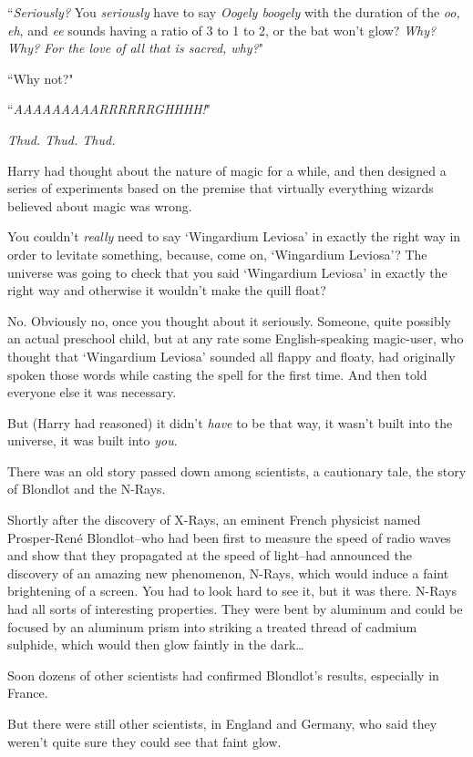 ``\emph{Seriously?} You \emph{seriously} have to say \emph{Oogely boogely} with the duration of the \emph{oo, eh}, and \emph{ee} sounds having a ratio of 3 to 1 to 2, or the bat won't glow? \emph{Why? Why? For the love of all that is sacred, why?}"

``Why not?"

``\emph{AAAAAAAAARRRRRRGHHHH!}"

\emph{Thud. Thud. Thud.}

Harry had thought about the nature of magic for a while, and then designed a series of experiments based on the premise that virtually everything wizards believed about magic was wrong.

You couldn't \emph{really} need to say `Wingardium Leviosa' in exactly the right way in order to levitate something, because, come on, `Wingardium Leviosa'? The universe was going to check that you said `Wingardium Leviosa' in exactly the right way and otherwise it wouldn't make the quill float?

No. Obviously no, once you thought about it seriously. Someone, quite possibly an actual preschool child, but at any rate some English-speaking magic-user, who thought that `Wingardium Leviosa' sounded all flappy and floaty, had originally spoken those words while casting the spell for the first time. And then told everyone else it was necessary.

But (Harry had reasoned) it didn't \emph{have} to be that way, it wasn't built into the universe, it was built into \emph{you}.

There was an old story passed down among scientists, a cautionary tale, the story of Blondlot and the N-Rays.

Shortly after the discovery of X-Rays, an eminent French physicist named Prosper-René Blondlot\---who had been first to measure the speed of radio waves and show that they propagated at the speed of light\---had announced the discovery of an amazing new phenomenon, N-Rays, which would induce a faint brightening of a screen. You had to look hard to see it, but it was there. N-Rays had all sorts of interesting properties. They were bent by aluminum and could be focused by an aluminum prism into striking a treated thread of cadmium sulphide, which would then glow faintly in the dark{\ldots}

Soon dozens of other scientists had confirmed Blondlot's results, especially in France.

But there were still other scientists, in England and Germany, who said they weren't quite sure they could see that faint glow.

